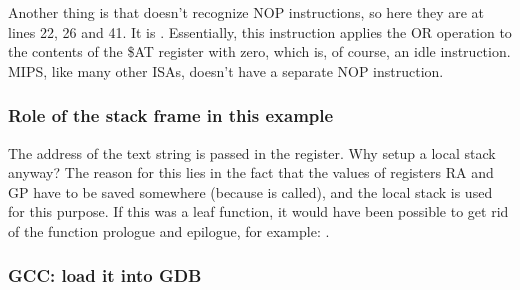 
Another thing is that \IDA doesn't recognize \ac{NOP} instructions, so here they are at lines 22, 26 and 41.
It is .
Essentially, this instruction applies the OR operation to the contents of the \$AT register
with zero, which is, of course, an idle instruction.
MIPS, like many other \ac{ISA}s, doesn't have a separate \ac{NOP} instruction.

\subsubsection{Role of the stack frame in this example}

The address of the text string is passed in the register.
Why setup a local stack anyway?
The reason for this lies in the fact that the values of registers \ac{RA} and GP have to be saved somewhere 
(because \printf is called), and the local stack is used for this purpose.
If this was a \gls{leaf function}, it would have been possible to get rid of the function prologue and epilogue,
for example: .

\subsubsection{\Optimizing GCC: load it into GDB}



